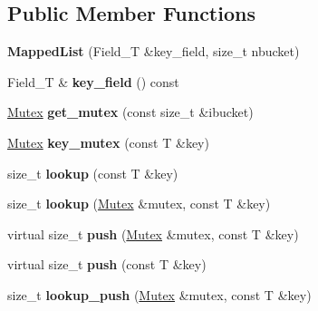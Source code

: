 \subsection*{Public Member Functions}
\begin{DoxyCompactItemize}
\item 
{\bfseries Mapped\+List} (Field\+\_\+T \&key\+\_\+field, size\+\_\+t nbucket)\hypertarget{classMappedList_a44b41bb6e529b41ffcefbe56eb4adfd1}{}\label{classMappedList_a44b41bb6e529b41ffcefbe56eb4adfd1}

\item 
Field\+\_\+T \& {\bfseries key\+\_\+field} () const \hypertarget{classMappedList_aa46baabdba480df9a86acdcd18b1188c}{}\label{classMappedList_aa46baabdba480df9a86acdcd18b1188c}

\item 
\hyperlink{classMutex}{Mutex} {\bfseries get\+\_\+mutex} (const size\+\_\+t \&ibucket)\hypertarget{classMappedList_adb79b255ef483be6db0e5b1df8b67427}{}\label{classMappedList_adb79b255ef483be6db0e5b1df8b67427}

\item 
\hyperlink{classMutex}{Mutex} {\bfseries key\+\_\+mutex} (const T \&key)\hypertarget{classMappedList_ac71caaf3d9ef84b2a8ebe74aceb521e3}{}\label{classMappedList_ac71caaf3d9ef84b2a8ebe74aceb521e3}

\item 
size\+\_\+t {\bfseries lookup} (const T \&key)\hypertarget{classMappedList_a4012839b741959be24806c84822771ee}{}\label{classMappedList_a4012839b741959be24806c84822771ee}

\item 
size\+\_\+t {\bfseries lookup} (\hyperlink{classMutex}{Mutex} \&mutex, const T \&key)\hypertarget{classMappedList_ab27b585e903b60f7fbe0c0645a4f3f93}{}\label{classMappedList_ab27b585e903b60f7fbe0c0645a4f3f93}

\item 
virtual size\+\_\+t {\bfseries push} (\hyperlink{classMutex}{Mutex} \&mutex, const T \&key)\hypertarget{classMappedList_aedad74b21e53866cbfaace5118e4e280}{}\label{classMappedList_aedad74b21e53866cbfaace5118e4e280}

\item 
virtual size\+\_\+t {\bfseries push} (const T \&key)\hypertarget{classMappedList_abc5b44b2f55df6a16bbe6855c49356fc}{}\label{classMappedList_abc5b44b2f55df6a16bbe6855c49356fc}

\item 
size\+\_\+t {\bfseries lookup\+\_\+push} (\hyperlink{classMutex}{Mutex} \&mutex, const T \&key)\hypertarget{classMappedList_aaae82638ef8160fd252aee948deb836b}{}\label{classMappedList_aaae82638ef8160fd252aee948deb836b}


\end{DoxyCompactItemize}
